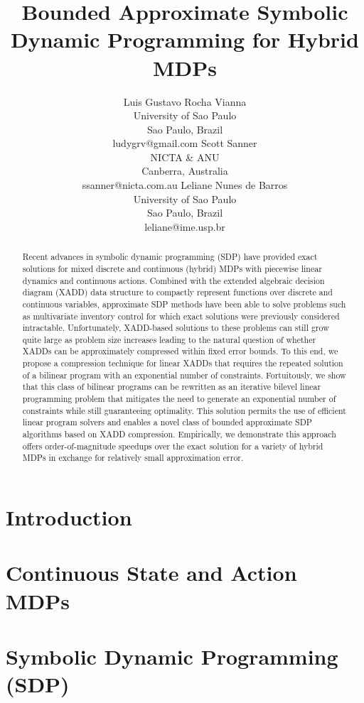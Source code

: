 \documentclass{article}
\title{	Bounded Approximate Symbolic Dynamic Programming for Hybrid MDPs }
\author{Luis Gustavo Rocha Vianna\\
University of Sao Paulo\\
Sao Paulo, Brazil\\
ludygrv@gmail.com
\And
Scott Sanner\\
NICTA \& ANU\\
Canberra, Australia\\
ssanner@nicta.com.au
\And
Leliane Nunes de Barros\\
University of Sao Paulo\\
Sao Paulo, Brazil\\
leliane@ime.usp.br}
\begin{document}
\maketitle

\begin{abstract}
Recent advances in symbolic dynamic programming (SDP) have provided
exact solutions for mixed discrete and continuous (hybrid) MDPs with
piecewise linear dynamics and continuous actions. Combined with the
extended algebraic decision diagram (XADD) data structure to compactly
represent functions over discrete and continuous variables,
approximate SDP methods have been able to solve problems such as
multivariate inventory control for which exact solutions were
previously considered intractable. Unfortunately, XADD-based solutions
to these problems can still grow quite large as problem size increases
leading to the natural question of whether XADDs can be approximately
compressed within fixed error bounds. To this end, we propose a
compression technique for linear XADDs that requires the repeated
solution of a bilinear program with an exponential number of
constraints. Fortuitously, we show that this class of bilinear
programs can be rewritten as an iterative bilevel linear programming
problem that mitigates the need to generate an exponential number of
constraints while still guaranteeing optimality. This solution permits
the use of efficient linear program solvers and enables a novel class
of bounded approximate SDP algorithms based on XADD
compression. Empirically, we demonstrate this approach offers
order-of-magnitude speedups over the exact solution for a variety of
hybrid MDPs in exchange for relatively small approximation error.
\end{abstract}

\section{Introduction}



\section{Continuous State and Action MDPs}



\section{Symbolic Dynamic Programming (SDP)}
\end{document}
